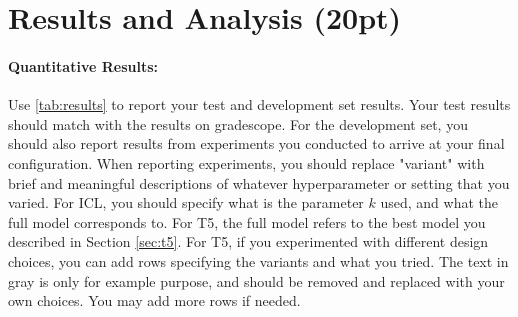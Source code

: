\documentclass{article}
\begin{document}
\newpage



\section{Results and Analysis (20pt)}

\paragraph{Quantitative Results:} Use \autoref{tab:results} to report your test and development set results. 
Your test results should match with the results on gradescope. 
For the development set, you should also report results from experiments you conducted to arrive at your final configuration.
When reporting experiments, you should replace "variant" with brief and meaningful descriptions of whatever hyperparameter or setting that you varied. 
For ICL, you should specify what is the parameter $k$ used, and what the full model corresponds to. For T5, the full model refers to the best model you described in Section \ref{sec:t5}.
For T5, if you experimented with different design choices, you can add rows specifying the variants and what you tried.
The text in gray is only for example purpose, and should be removed and replaced with your own choices.
You may add more rows if needed.
\end{document}
